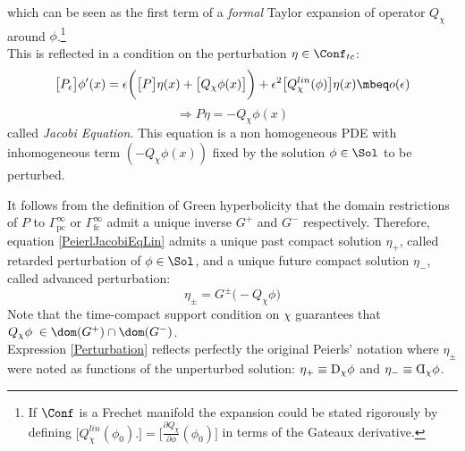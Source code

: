 \documentclass[Main]{subfiles}
\begin{document}
		which can be seen as the first term of a \emph{formal} Taylor expansion of operator $Q_\chi$ around $\phi$.\footnote{If $\Conf$ is a Frechet manifold the expansion could be stated rigorously by defining $\big[Q_\chi^{lin}(\phi_0) . \big] = \big[\frac{\partial Q_\chi}{\partial \phi} (\phi_0)\big] $ in terms of the Gateaux derivative.}
		\\
		This is reflected in a condition on the perturbation $\eta \in \Conf_{tc}$:
		\begin{displaymath}
			\big[P_\epsilon\big] \phi'(x) =  \epsilon \biggr( \big[P\big] \eta(x) + \big[Q_\chi \phi(x) \big]\biggr)+ \epsilon^2 \big[Q_\chi^{lin}(\phi)  \big]	\eta(x) \mbeq o(\epsilon)
		\end{displaymath}
		\begin{equation}\label{PeierlJacobiEqLin}
			\Rightarrow P \eta = - Q_\chi \phi(x)
		\end{equation}
		called \emph{Jacobi Equation}.
		This equation is a non homogeneous PDE with inhomogeneous term $ (- Q_\chi \phi(x))$ fixed by the solution $\phi\in \Sol$ to be perturbed.

		It follows from the definition of Green hyperbolicity that the domain restrictions of $P$ to $\Gamma^\infty_{\textrm{pc}}$ or $\Gamma^\infty_{\textrm{fc}}$ admit a unique inverse $G^+$ and $G^-$ respectively.
   		Therefore, equation \ref{PeierlJacobiEqLin} admits a unique past compact solution $\eta_+$, called retarded perturbation of $\phi\in \Sol$, and a unique future compact solution $\eta_-$, called advanced perturbation:
   		\begin{equation}\label{Perturbation}
   			\eta_\pm = G^\pm \big( - Q_\chi \phi \big)
   		\end{equation}
   		Note that the time-compact support condition on $\chi$ guarantees that $Q_\chi \phi \; \in \dom(G^+) \cap \dom(G^-)$.
   		\\
   		Expression \ref{Perturbation} reflects perfectly the original Peierls' notation where $\eta_\pm$ were noted as functions of the unperturbed solution: $\eta_+ \equiv\reflectbox{\reflectbox{D}}_\chi \phi$ and $\eta_- \equiv  \reflectbox{D}_\chi \phi$.
		
\end{document}
